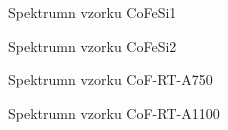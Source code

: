 \begin{figure}

\caption{Spektrumn vzorku CoFeSi1}
\label{sCoFeSi1}
\end{figure}

\begin{figure}

\caption{Spektrumn vzorku CoFeSi2}
\label{sCoFeSi2}
\end{figure}

\begin{figure}

\caption{Spektrumn vzorku CoF-RT-A750}
\label{sCoF-RT-A750}
\end{figure}

\begin{figure}

\caption{Spektrumn vzorku CoF-RT-A1100}
\label{sCoF-RT-A1100}
\end{figure}
